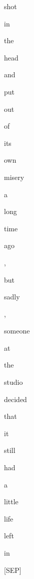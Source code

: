 \documentclass[varwidth=150mm]{standalone}
\begin{document}
\begin{CJK*}{UTF8}{gbsn}
{{{\colorbox{red!7.301787376403809}{\strut shot} \colorbox{red!0.0}{\strut in} \colorbox{red!0.0}{\strut the} \colorbox{red!1.490250587463379}{\strut head} \colorbox{red!2.4412031173706055}{\strut and} \colorbox{red!0.0}{\strut put} \colorbox{red!0.0}{\strut out} \colorbox{red!0.0}{\strut of} \colorbox{red!4.774497985839844}{\strut its} \colorbox{red!0.0}{\strut own} \colorbox{red!1.0047922134399414}{\strut misery} \colorbox{red!0.0}{\strut a} \colorbox{red!0.0}{\strut long} \colorbox{red!0.0}{\strut time} \colorbox{red!0.0}{\strut ago} \colorbox{red!0.0}{\strut ,} \colorbox{red!2.228212356567383}{\strut but} \colorbox{red!3.0745646953582764}{\strut sadly} \colorbox{red!0.0}{\strut ,} \colorbox{red!3.3432304859161377}{\strut someone} \colorbox{red!1.2083998918533325}{\strut at} \colorbox{red!1.3001552820205688}{\strut the} \colorbox{red!2.4728407859802246}{\strut studio} \colorbox{red!1.0541021823883057}{\strut decided} \colorbox{red!1.933629035949707}{\strut that} \colorbox{red!56.69635772705078}{\strut it} \colorbox{red!2.3381245136260986}{\strut still} \colorbox{red!1.9523894786834717}{\strut had} \colorbox{red!0.0}{\strut a} \colorbox{red!1.1104379892349243}{\strut little} \colorbox{red!0.0}{\strut life} \colorbox{red!0.0}{\strut left} \colorbox{red!8.129260063171387}{\strut in} \colorbox{red!6.85459566116333}{\strut [SEP]}
}}}
\end{CJK*}
\end{document}
